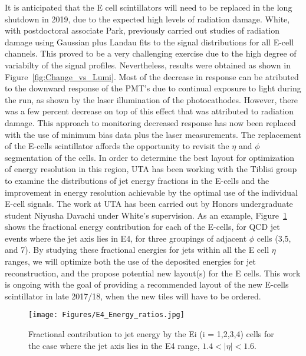 It is anticipated that the E cell scintillators will need to be replaced in the long 
shutdown in 2019, due to the expected high levels of radiation damage. White, with postdoctoral
associate Park, previously carried out studies of radiation damage using Gaussian plus
Landau fits to the signal distributions for all E-cell channels. This proved to be a very
challenging exercise due to the high degree of variabilty of the signal profiles.
Nevertheless, results were obtained as shown in Figure~\ref{fig:Change_vs_Lumi}. Most of the
decrease in response can be atributed to the downward response of the PMT's due to continual 
exposure to light during the run, as shown by the laser illumination of the photocathodes. 
However, there was a few percent decrease on top of this effect that was attributed to radiation 
damage. This approach to monitoring decreased response has now been replaced with the use of 
minimum bias data plus the laser measurements.
The replacement of the E-cells scintillator affords the opportunity to revisit the $\eta$ and $\phi$ 
segmentation of the cells. In order to determine the best layout for optimization of energy 
resolution in this region, UTA has been working with the Tiblisi group to examine the distributions
of jet energy fractions in the E-cells and the improvement in energy resolution achievable by the
optimal use of the individual E-cell signals. The work at UTA has been carried out by Honors
undergraduate student Niyusha Davachi under White's supervision. As an example, Figure~\ref{fig:E4_Energy_ratios} 
shows the fractional energy contribution for each of the E-cells, for QCD jet events where the jet axis lies in E4,
for three groupings of adjacent $\phi$ cells (3,5, and 7). By studying these fractional energies for jets within all 
the E cell $\eta$ ranges, we will optimize both the use of the deposited energies for jet reconstruction, 
and the propose potential new layout(s) for the E cells. This work is ongoing with the
goal of providing a recommended layout of the new E-cells scintillator in late 2017/18, when the new tiles will 
have to be ordered. 

\begin{figure}[htb]
\centering

      \texttt{[image: Figures/E4\_Energy\_ratios.jpg]}
      \label{fig:E4_Energy_ratios}

\caption{Fractional contribution to jet energy by the Ei (i = 1,2,3,4) cells for the case where the jet axis 
lies in the E4 range, $1.4 < |\eta| < 1.6$.}
\end{figure}

